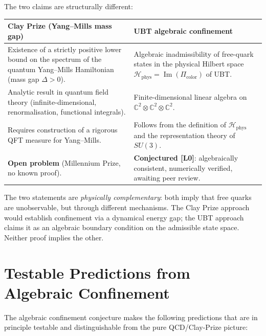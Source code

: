 \documentclass[12pt,a4paper]{article}
\newcommand{\Hphys}{\mathcal{H}_{\mathrm{phys}}}
\newcommand{\Picolor}{\Pi_{\mathrm{color}}}
\newcommand{\CCC}{\mathbb{C}}
\begin{document}
The two claims are structurally different:

\begin{center}
\begin{tabular}{p{}p{}}
\hline
\textbf{Clay Prize (Yang--Mills mass gap)} & \textbf{UBT algebraic confinement} \\
\hline
Existence of a strictly positive lower bound on the spectrum of the quantum
Yang--Mills Hamiltonian (mass gap $\Delta > 0$). &
Algebraic inadmissibility of free-quark states in the physical Hilbert space
$\Hphys = \operatorname{Im}(\Picolor)$ of UBT. \\[4pt]
Analytic result in quantum field theory (infinite-dimensional, renormalisation,
functional integrals). &
Finite-dimensional linear algebra on $\CCC^2 \otimes \CCC^2 \otimes \CCC^2$.
\\[4pt]
Requires construction of a rigorous QFT measure for Yang--Mills. &
Follows from the definition of $\Hphys$ and the representation theory of
$SU(3)$. \\[4pt]
\textbf{Open problem} (Millennium Prize, no known proof). &
\textbf{Conjectured [L0]}: algebraically consistent, numerically verified,
awaiting peer review. \\
\hline
\end{tabular}
\end{center}

\medskip
The two statements are \emph{physically complementary}: both imply that free
quarks are unobservable, but through different mechanisms.  The Clay Prize
approach would establish confinement via a dynamical energy gap; the UBT approach
claims it as an algebraic boundary condition on the admissible state space.
Neither proof implies the other.

\section{Testable Predictions from Algebraic Confinement}
\label{sec:testable}

The algebraic confinement conjecture makes the following predictions that are in
principle testable and distinguishable from the pure QCD/Clay-Prize picture:
\end{document}
